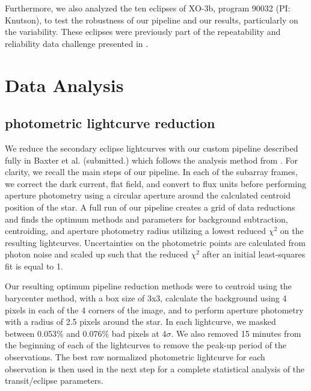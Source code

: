 Furthermore, we also analyzed the ten eclipses of XO-3b, program 90032 (PI: Knutson), to test the robustness of our pipeline and our results, particularly on the variability. These eclipses were previously part of the repeatability and reliability data challenge presented in \citet{Ingalls2016}.

\section{Data Analysis}

\subsection{\spitzerIRAC photometric lightcurve reduction}

We reduce the \spitzerIRAC secondary eclipse lightcurves with our custom pipeline described fully in Baxter et al. (submitted.) which follows the analysis method from \citep{Deming2015}. For clarity, we recall the main steps of our pipeline. In each of the \spitzer subarray frames, we correct the dark current, flat field, and convert to flux units before performing aperture photometry using a circular aperture around the calculated centroid position of the star. %
A full run of our pipeline creates a grid of data reductions and finds the optimum methods and parameters for background subtraction, centroiding, and aperture photometry radius utilizing a lowest reduced $\chi^2$ on the resulting lightcurves. Uncertainties on the photometric points are calculated from photon noise and scaled up such that the reduced $\chi^2$ after an initial least-squares fit is equal to 1.

Our resulting optimum pipeline reduction methods were to centroid using the barycenter method, with a box size of 3x3, calculate the background using 4 pixels in each of the 4 corners of the image, and to perform aperture photometry with a radius of 2.5 pixels around the star. In each lightcurve, we masked between 0.053\% and 0.076\% bad pixels at 4$\sigma$. We also removed 15 minutes from the beginning of each of the lightcurves to remove the peak-up period of the observations. The best raw normalized photometric lightcurve for each observation is then used in the next step for a complete statistical analysis of the transit/eclipse parameters.

